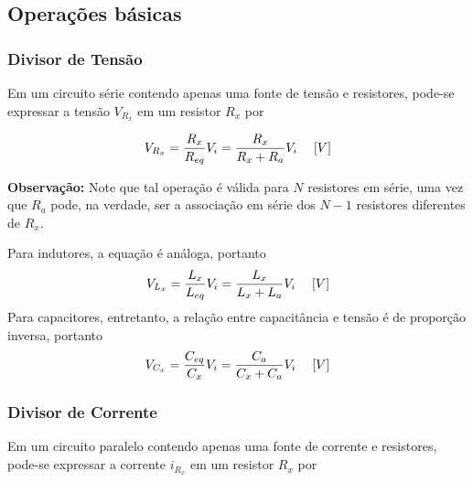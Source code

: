 \documentclass{article}
\numberwithin{equation}{section}
\begin{document}
\subsection{Operações básicas}

\subsubsection{Divisor de Tensão}
\label{subsubsec:divten}
Em um circuito série contendo apenas uma fonte de tensão e resistores, pode-se expressar a tensão $V_{R_x}$ em um resistor $R_{x}$ por

\begin{center}
\end{center}

\begin{equation}
    V_{R_x}=\frac{R_{x}}{R_{eq}}V_{i}=\frac{R_{x}}{R_{x}+R_{a}}V_{i} \hspace{0.45cm}[V]
\end{equation}

\vspace{2mm}

 \textbf{Observação:} Note que tal operação é válida para $N$ resistores em série, uma vez que $R_a$ pode, na verdade, ser a associação em série dos $N-1$ resistores diferentes de $R_x$.

\vspace{4mm}

\justifying

\noindent Para indutores, a equação é análoga, portanto
\begin{equation}
    V_{L_x}=\frac{L_{x}}{L_{eq}}V_{i}=\frac{L_{x}}{L_{x}+L_{a}}V_{i} \hspace{0.45cm}[V]
\end{equation}
Para capacitores, entretanto, a relação entre capacitância e tensão é de proporção inversa, portanto
\begin{equation}
    V_{C_x}=\frac{C_{eq}}{C_{x}}V_{i}=\frac{C_{a}}{C_{x}+C_{a}}V_{i} \hspace{0.45cm}[V]
\end{equation}

\subsubsection{Divisor de Corrente}
\label{subsubsec:divcor}
Em um circuito paralelo contendo apenas uma fonte de corrente e resistores, pode-se expressar a corrente $i_{R_x}$ em um resistor $R_{x}$ por
\end{document}
